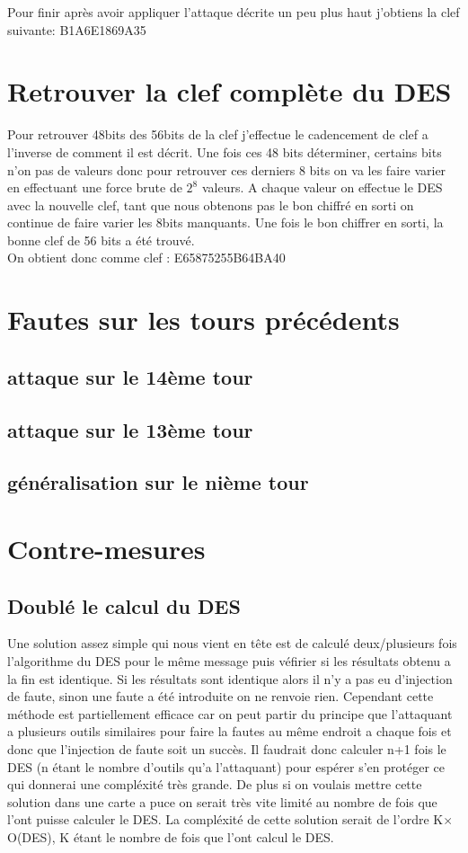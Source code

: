 \documentclass[a4paper]{report}
\begin{document}
			Pour finir après avoir appliquer l'attaque décrite un peu plus haut j'obtiens la clef suivante: B1A6E1869A35
		\chapter{Retrouver la clef complète du DES}
			Pour retrouver 48bits des 56bits de la clef j'effectue le cadencement de clef a l'inverse de comment il est décrit.
			Une fois ces 48 bits déterminer, certains bits n'on pas de valeurs donc pour retrouver ces derniers 8 bits on va les faire varier en effectuant une force brute de $2^{8}$ valeurs. A chaque valeur on effectue le DES avec la nouvelle clef, tant que nous obtenons pas le bon chiffré en sorti on continue de faire varier les 8bits manquants. Une fois le bon chiffrer en sorti, la bonne clef de 56 bits a été trouvé.\\
			
			On obtient donc comme clef : E65875255B64BA40
		
		\chapter{Fautes sur les tours précédents}
			\section{attaque sur le 14ème tour}
			\section{attaque sur le 13ème tour}
			\section{généralisation sur le nième tour}
		
		\chapter{Contre-mesures}
			\section{Doublé le calcul du DES}
				Une solution assez simple qui nous vient en tête est de calculé deux/plusieurs fois l'algorithme du DES pour le même message puis véfirier si les résultats obtenu a la fin est
				identique.
				Si les résultats sont identique alors il n'y a pas eu d'injection de faute, sinon une faute a été introduite on ne renvoie rien.
				Cependant cette méthode est partiellement efficace car on peut partir du principe que l'attaquant a plusieurs outils similaires pour faire la fautes au même endroit a chaque fois et 
				donc que l'injection de faute soit un succès. 
				Il faudrait donc calculer n+1 fois le DES (n étant le nombre d'outils qu'a l'attaquant) pour espérer s'en protéger ce qui donnerai une compléxité très grande. 
				De plus si on voulais mettre cette solution dans une carte a puce on serait très vite limité au nombre de fois que l'ont puisse calculer le DES.
				La compléxité de cette solution serait de l'ordre K$\times$O(DES), K étant le nombre de fois que l'ont calcul le DES.
			
\end{document}
